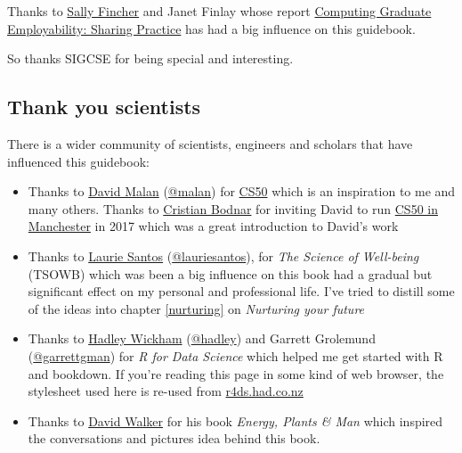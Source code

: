 \documentclass[
]{book}
\providecommand{\tightlist}{%
  \setlength{\itemsep}{0pt}\setlength{\parskip}{0pt}}
\begin{document}
Thanks to \href{https://en.wikipedia.org/wiki/Sally_Fincher}{Sally Fincher} and Janet Finlay whose report \href{https://kar.kent.ac.uk/53848}{Computing Graduate Employability: Sharing Practice} \citep{fincherreview} has had a big influence on this guidebook.

So thanks SIGCSE for being special and interesting. 🙏

\hypertarget{scientists}{%
\subsection{Thank you scientists}\label{scientists}}

There is a wider community of scientists, engineers and scholars that have influenced this guidebook:

\begin{itemize}
\tightlist
\item
  Thanks to \href{https://en.wikipedia.org/wiki/David_J._Malan}{David Malan} (\href{https://cs.harvard.edu/malan/}{@malan}) for \href{https://en.wikipedia.org/wiki/CS50}{CS50} which is an inspiration to me and many others. \citep{cs50, cs50zoom, CS502021} Thanks to \href{https://crisbodnar.github.io/}{Cristian Bodnar} for inviting David to run \href{http://cs50.hacksoc.com}{CS50 in Manchester} in 2017 which was a great introduction to David's work \citep{cs50mcr}
\item
  Thanks to \href{https://en.wikipedia.org/wiki/Laurie_R._Santos}{Laurie Santos} (\href{https://twitter.com/lauriesantos}{@lauriesantos}), for \emph{The Science of Well-being} (TSOWB) \citep{lauriesantos} which was been a big influence on this book had a gradual but significant effect on my personal and professional life. I've tried to distill some of the ideas into chapter \ref{nurturing} on \emph{Nurturing your future}
\item
  Thanks to \href{https://en.wikipedia.org/wiki/Hadley_Wickham}{Hadley Wickham} (\href{https://github.com/hadley}{@hadley}) and Garrett Grolemund (\href{https://github.com/garrettgman}{@garrettgman}) for \emph{R for Data Science} \citep{r4ds} which helped me get started with R and bookdown. If you're reading this page in some kind of web browser, the stylesheet used here is re-used from \href{https://r4ds.had.co.nz/}{r4ds.had.co.nz}
\item
  Thanks to \href{https://en.wikipedia.org/wiki/David_A._Walker_(scientist)}{David Walker} for his book \emph{Energy, Plants \& Man} which inspired the conversations and pictures idea behind this book. \citep{epm}
\end{itemize}
\end{document}
